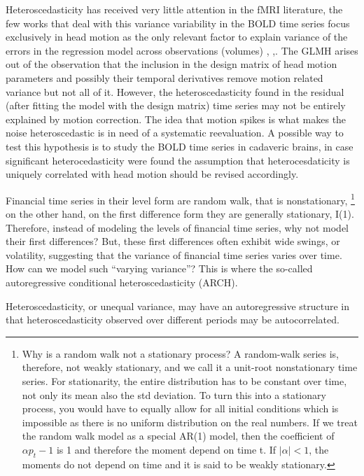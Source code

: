 \documentclass[10pt,letterpaper]{article}
\begin{document}
Heteroscedasticity has received very little attention in the fMRI literature, the few works that deal with this variance variability in the BOLD time series focus exclusively in head motion as the only relevant factor to explain variance of the errors in the regression model across observations (volumes) \citep{luo2003diagnosis}, \citep{diedrichsen2005detecting},\citep{eklund2017bayesian}. 
The GLMH arises out of the observation that the inclusion in the design matrix of head motion parameters and possibly their temporal derivatives remove motion related variance but not all of it. However, the heteroscedasticity found in the residual (after fitting the model with the design matrix) time series may not be entirely explained by motion correction. The idea that motion spikes is what makes the noise heteroscedastic is in need of a systematic reevaluation. A possible way to test this hypothesis is to study the BOLD time series in cadaveric brains, in case significant heterocedasticity were found the assumption that heterocesdaticity is uniquely correlated with head motion should be revised accordingly.


Financial time series in their level form are random walk, that is nonstationary, \footnote{Why is a random walk not a stationary process? A random-walk series is, therefore, not weakly stationary, and we call it a unit-root nonstationary time series. For stationarity, the entire distribution has to be constant over time, not only its mean also the std deviation. To turn this into a stationary process, you would have to equally allow for all initial conditions  which is impossible as there is no uniform distribution on the real numbers.  If we treat the random walk model as a special AR(1) model, then the coefficient of $\alpha p_t-1$ is 1 and therefore the moment depend on time t. If $|\alpha| < 1$, the moments do not depend on time and it is said to be weakly stationary.} on the other hand, on the first difference form they are generally stationary, I(1). Therefore, instead of modeling the levels of financial time series, why not model their first differences? But, these first differences often exhibit wide swings, or volatility, suggesting that the variance of financial time series varies over time. How can we model such “varying variance”? This is where the so-called autoregressive conditional heteroscedasticity (ARCH).

Heteroscedasticity, or unequal variance, may have an autoregressive structure in that heteroscedasticity observed over different periods may be autocorrelated. 
\end{document}
